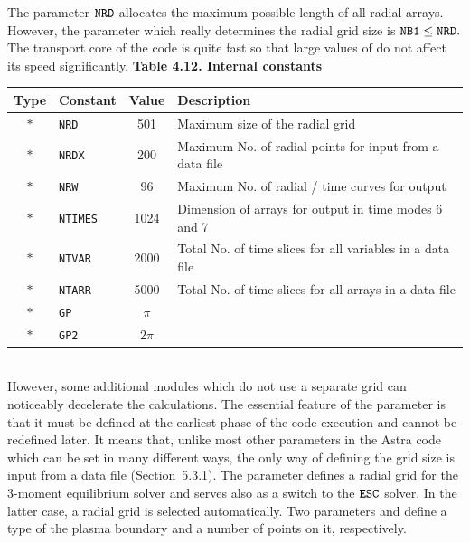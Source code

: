 The parameter $\tt NRD$ allocates the maximum possible length of all
radial arrays. 
However, the parameter which really determines the radial grid size is
$\tt NB1\leq NRD.$ 
The transport core of the code is quite fast so that large values of
 do not affect its speed significantly. 
\linebreak\indent
{\bf Table 4.12. Internal constants}\\[2ex]
\begin{tabular}{| c | l|c|l|}\hline
\hspace*{-1pt}\bf Type\hspace*{-1pt} & \bf Constant 
			&\bf Value &\bf Description	\\	\hline
 $*$ &\tt NRD   & 501  & Maximum size of the radial grid\\
 $*$ &\tt NRDX  & 200  
	& Maximum No. of radial points for input from a data file \\
 $*$ &\tt NRW   & 96   & Maximum No. of radial / time curves for output\\
 $*$ &\tt NTIMES& 1024 
	& Dimension of arrays for output in time modes 6 and 7\\
 $*$ &\tt NTVAR & 2000 
	& Total No. of time slices for all variables in a data file\\
 $*$ &\tt NTARR & 5000 
	& Total No. of time slices for all arrays in a data file\\
 $*$ &\tt GP    & $\pi$ & \\
 $*$ &\tt GP2   & $2\pi$   & \\
\hline
\end{tabular}\\[2ex]
However, some additional modules which do not use a separate grid can
noticeably decelerate the calculations.
The essential feature of the parameter  is that it must be
defined at the earliest phase of the code execution and cannot be
redefined later.
It means that, unlike most other parameters in the Astra code which can
be set in many different ways, the only way of defining the grid size
 is input from a data file (Section~5.3.1).
The parameter  defines a radial grid for the 3-moment
equilibrium solver and serves also as a switch to the $\tt{ESC}$ solver. 
In the latter case, a radial grid is selected automatically. 
Two parameters  and  define a type of the plasma
boundary and a number of points on it, respectively.

